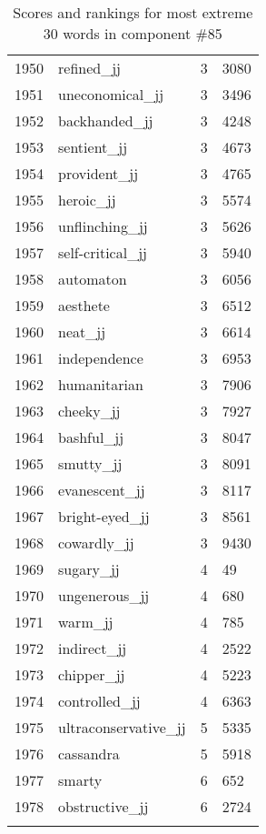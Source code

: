 \begin{longtable}[!htbp]{| rlr@{.}l |}
    1950 & refined\_jj & 3 & 3080 \\
    1951 & uneconomical\_jj & 3 & 3496 \\
    1952 & backhanded\_jj & 3 & 4248 \\
    1953 & sentient\_jj & 3 & 4673 \\
    1954 & provident\_jj & 3 & 4765 \\
    1955 & heroic\_jj & 3 & 5574 \\
    1956 & unflinching\_jj & 3 & 5626 \\
    1957 & self-critical\_jj & 3 & 5940 \\
    1958 & automaton & 3 & 6056 \\
    1959 & aesthete & 3 & 6512 \\
    1960 & neat\_jj & 3 & 6614 \\
    1961 & independence & 3 & 6953 \\
    1962 & humanitarian & 3 & 7906 \\
    1963 & cheeky\_jj & 3 & 7927 \\
    1964 & bashful\_jj & 3 & 8047 \\
    1965 & smutty\_jj & 3 & 8091 \\
    1966 & evanescent\_jj & 3 & 8117 \\
    1967 & bright-eyed\_jj & 3 & 8561 \\
    1968 & cowardly\_jj & 3 & 9430 \\
    1969 & sugary\_jj & 4 & 49 \\
    1970 & ungenerous\_jj & 4 & 680 \\
    1971 & warm\_jj & 4 & 785 \\
    1972 & indirect\_jj & 4 & 2522 \\
    1973 & chipper\_jj & 4 & 5223 \\
    1974 & controlled\_jj & 4 & 6363 \\
    1975 & ultraconservative\_jj & 5 & 5335 \\
    1976 & cassandra & 5 & 5918 \\
    1977 & smarty & 6 & 652 \\
    1978 & obstructive\_jj & 6 & 2724 \\
    \hline
    \caption{Scores and rankings for most extreme 30 words in component \#85} \\
\end{longtable}

